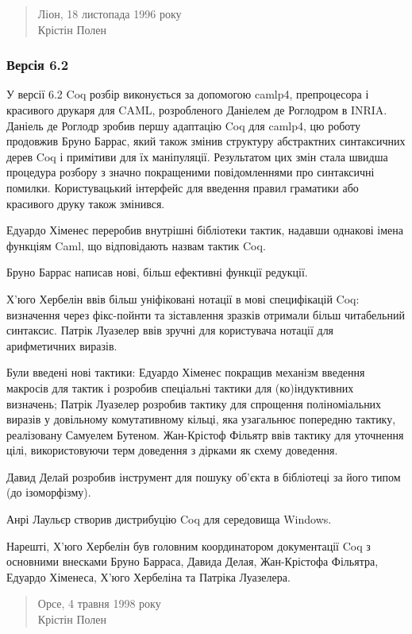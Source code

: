 \documentclass{article}
\begin{document}
\begin{quote}
Ліон, 18 листопада 1996 року \\
Крістін Полен
\end{quote}

\subsubsection{Версія 6.2}

У версії 6.2 Coq розбір виконується за допомогою camlp4, препроцесора і красивого друкаря для CAML, розробленого Даніелем де Роглодром в INRIA. Даніель де Роглодр зробив першу адаптацію Coq для camlp4, цю роботу продовжив Бруно Баррас, який також змінив структуру абстрактних синтаксичних дерев Coq і примітиви для їх маніпуляції. Результатом цих змін стала швидша процедура розбору з значно покращеними повідомленнями про синтаксичні помилки. Користувацький інтерфейс для введення правил граматики або красивого друку також змінився.

Едуардо Хіменес переробив внутрішні бібліотеки тактик, надавши однакові імена функціям Caml, що відповідають назвам тактик Coq.

Бруно Баррас написав нові, більш ефективні функції редукції.

Х’юго Хербелін ввів більш уніфіковані нотації в мові специфікацій Coq: визначення через фікс-пойнти та зіставлення зразків отримали більш читабельний синтаксис. Патрік Луазелер ввів зручні для користувача нотації для арифметичних виразів.

Були введені нові тактики: Едуардо Хіменес покращив механізм введення макросів для тактик і розробив спеціальні тактики для (ко)індуктивних визначень; Патрік Луазелер розробив тактику для спрощення поліноміальних виразів у довільному комутативному кільці, яка узагальнює попередню тактику, реалізовану Самуелем Бутеном. Жан-Крістоф Фільятр ввів тактику для уточнення цілі, використовуючи терм доведення з дірками як схему доведення.

Давид Делай розробив інструмент для пошуку об’єкта в бібліотеці за його типом (до ізоморфізму).

Анрі Лаульєр створив дистрибуцію Coq для середовища Windows.

Нарешті, Х’юго Хербелін був головним координатором документації Coq з основними внесками Бруно Барраса, Давида Делая, Жан-Крістофа Фільятра, Едуардо Хіменеса, Х’юго Хербеліна та Патріка Луазелера.

\begin{quote}
Орсе, 4 травня 1998 року \\
Крістін Полен
\end{quote}
\end{document}
